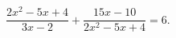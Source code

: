 \begin{ex}[type=equation]
	\begin{condition}
		$\dfrac{2x^2 - 5x + 4}{3x - 2} + \dfrac{15x -10}{2x^2 - 5x + 4} = 6.$
	\end{condition}
\end{ex}